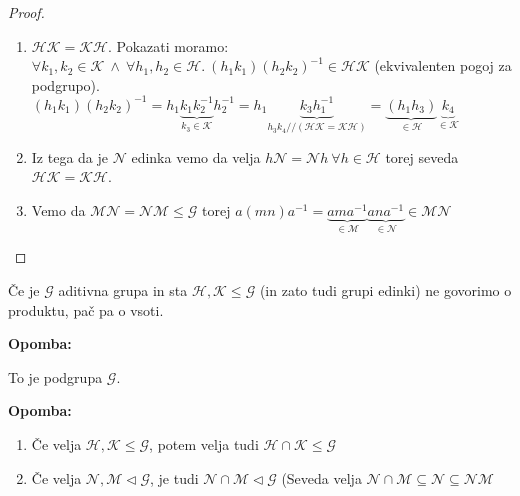 \documentclass[a4paper]{article}
\newcounter{environment:definition_counter}
\newcounter{environment:theorem_counter}
\newcounter{environment:statement_counter}
\newenvironment{remark}
{\textbf{Opomba:}}
{}
\begin{document}
\begin{proof}\leavevmode
\begin{enumerate}
\item $\mathcal{H}\mathcal{K}=\mathcal{K}\mathcal{H}$. Pokazati moramo: $\forall k_1, k_2 \in \mathcal{K} \ \land \ \forall h_1,h_2 \in \mathcal{H}. \ (h_1k_1)(h_2k_2)^{-1} \in \mathcal{H}\mathcal{K}$ (ekvivalenten pogoj za podgrupo).\\
$(h_1k_1)(h_2k_2)^{-1} = h_1 \underbrace{k_1 k_2^{-1}}_{k_3 \in \mathcal{K}} h_2^{-1} = h_1 \underbrace{k_3 h_1^{-1}}_{h_3k_4 // (\mathcal{H}\mathcal{K} = \mathcal{K}\mathcal{H})} = \underbrace{(h_1 h_3)}_{\in \mathcal{H}}\underbrace{k_4}_{\in \mathcal{K}} $
\item Iz tega da je $\mathcal{N}$ edinka vemo da velja $h\mathcal{N} = \mathcal{N}h \ \forall h \in \mathcal{H}$ torej seveda $\mathcal{H}\mathcal{K}=\mathcal{K}\mathcal{H}$.
\item Vemo da $\mathcal{M}\mathcal{N}=\mathcal{N}\mathcal{M} \leq \mathcal{G}$ torej $a(mn)a^{-1} =  \underbrace{ama^{-1}}_{\in \mathcal{M}} \underbrace{ana^{-1}}_{\in \mathcal{N}} \in \mathcal{M}\mathcal{N}$ 
\end{enumerate}
\end{proof}

Če je $\mathcal{G}$ aditivna grupa in sta $\mathcal{H}, \mathcal{K} \leq \mathcal{G}$ (in zato tudi grupi edinki) ne govorimo o produktu, pač pa o vsoti.


\begin{remark}

To je podgrupa $\mathcal{G}$.

\end{remark}

\begin{remark}

\begin{enumerate}

\item Če velja $\mathcal{H}, \mathcal{K} \leq \mathcal{G}$, potem velja tudi $\mathcal{H} \cap \mathcal{K} \leq \mathcal{G}$

\item Če velja $\mathcal{N}, \mathcal{M} \triangleleft \mathcal{G}$, je tudi $\mathcal{N} \cap \mathcal{M} \triangleleft \mathcal{G}$ (Seveda velja $\mathcal{N} \cap \mathcal{M} \subseteq \mathcal{N} \subseteq \mathcal{N} \mathcal{M}$

\end{enumerate}

\end{remark}
\end{document}
